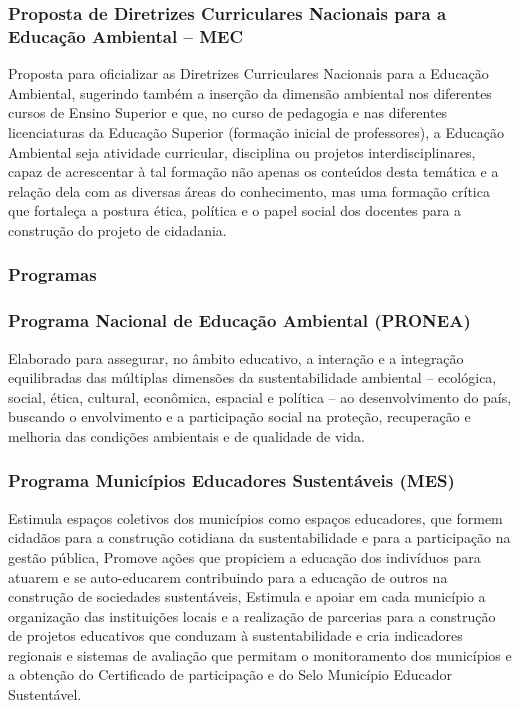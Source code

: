 \begin{subapend}
\begin{subsubapend}
		\subsubsection{Proposta de Diretrizes Curriculares Nacionais para a Educação Ambiental – MEC}
		Proposta para oficializar as Diretrizes Curriculares Nacionais para a Educação Ambiental, sugerindo também a inserção da dimensão ambiental nos diferentes cursos de Ensino Superior e que, no curso de pedagogia e nas diferentes licenciaturas da Educação Superior (formação inicial de professores), a Educação Ambiental seja atividade curricular, disciplina ou projetos interdisciplinares, capaz de acrescentar à tal formação não apenas os conteúdos desta temática e a relação dela com as diversas áreas do conhecimento, mas uma formação crítica que fortaleça a postura ética, política e o papel social dos docentes para a construção do projeto de cidadania.
		\subsubsection{Programas}
		\subsubsection{Programa Nacional de Educação Ambiental (PRONEA)}
		Elaborado para assegurar, no âmbito educativo, a interação e a integração equilibradas das múltiplas dimensões da sustentabilidade ambiental – ecológica, social, ética, cultural, econômica, espacial e política – ao desenvolvimento do país, buscando o envolvimento e a participação social na proteção, recuperação e melhoria das condições ambientais e de qualidade de vida.
		\subsubsection{Programa Municípios Educadores Sustentáveis (MES)}
		Estimula espaços coletivos dos municípios como espaços educadores, que formem cidadãos para a construção cotidiana da sustentabilidade e para a participação na gestão pública, Promove ações que propiciem a educação dos indivíduos para atuarem e se auto-educarem contribuindo para a educação de outros na construção de sociedades sustentáveis, Estimula e apoiar em cada município a organização das instituições locais e a realização de parcerias para a construção de projetos educativos que conduzam à sustentabilidade e cria indicadores regionais e sistemas de avaliação que permitam o monitoramento dos municípios e a obtenção do Certificado de participação e do Selo Município Educador Sustentável.
	\end{subsubapend}
\end{subapend}

